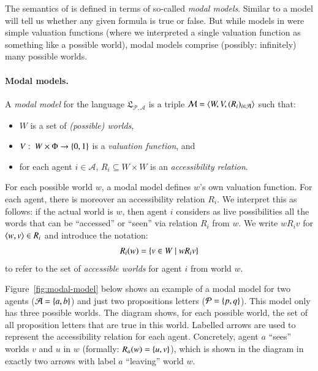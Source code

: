 \documentclass[nobib,nofonts]{tufte-handout}
\newcommand{\proplog}{\acro{PropLog}}
\newcommand{\Props}{\ensuremath{\Phi}}
\newcommand{\ts}{\ensuremath{\thinspace}}
\newcommand{\ra}{\ensuremath{\rightarrow}}
\newcommand{\Model}{\ensuremath{\mathcal{M}}}
\newcommand{\modlog}{\acro{ModLog}}
\begin{document}
The semantics of \modlog is defined in terms of so-called \emph{modal models}.
Similar to \proplog a model will tell us whether any given formula is true or false.
But while models in \proplog were simple valuation functions (where we interpreted a single valuation function as something like a possible world), modal models comprise (possibly: infinitely) many possible worlds.

\paragraph{Modal models.} A \emph{modal model} for the language $\mathfrak{L}_{\mathcal{P}, \mathcal{A}}$ is a triple $\Model = \tuple{W,V,(R_i)_{i \in \mathcal{A}}}$ such that:
\begin{itemize}[]
  \item $W$ is a set of \emph{(possible) worlds},
  \item $V \ts \colon \ts W \times \Props  \ra \set{0,1}$
  is a \emph{valuation function}, and
  \item for each agent $i \in \mathcal{A}$, $R_i \subseteq W
  \times W$ is an \emph{accessibility relation}.
\end{itemize}
For each possible world $w$, a modal model defines $w$'s own valuation function.
For each agent, there is moreover an accessibility relation $R_{i}$.
We interpret this as follows: if the actual world is $w$, then agent $i$ considers as live possibilities all the words that can be ``accessed'' or ``seen'' via relation $R_{i}$ from $w$.
We write $wR_iv$ for $\left \langle w,v\right\rangle \in R_i$ and introduce the notation:
\begin{align*}
R_i(w) = \left\{v \in W \mid wR_iv\right\}
\end{align*}
to refer to the set of \emph{accessible worlds} for agent $i$ from world $w$.

Figure~\ref{fig:modal-model} below shows an example of a modal model for two agents ($\mathcal{A} = \left\{a,b\right\}$) and just two propositions letters ($\mathcal{P} = \left\{p, q\right\}$).
This model only has three possible worlds.
The diagram shows, for each possible world, the set of all proposition letters that are true in this world.
Labelled arrows are used to represent the accessibility relation for each agent.
Concretely, agent $a$ ``sees'' worlds $v$ and $u$ in $w$ (formally: $R_{a}(w) = \left\{u,v\right\}$), which is shown in the diagram in exactly two arrows with label $a$ ``leaving'' world $w$.
\end{document}

